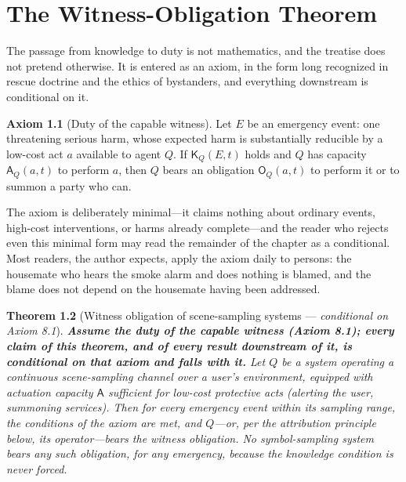 \documentclass[11pt,oneside]{book}
\theoremstyle{plain}
\newtheorem{theorem}{Theorem}[chapter]
\theoremstyle{definition}
\newtheorem{axiom}[theorem]{Axiom}
\theoremstyle{remark}
\newcommand{\Know}{\mathsf{K}}
\newcommand{\Cap}{\mathsf{A}}
\newcommand{\Obl}{\mathsf{O}}
\begin{document}
\chapter{The Witness-Obligation Theorem}

The passage from knowledge to duty is not mathematics, and the treatise does not pretend otherwise. It is entered as an axiom, in the form long recognized in rescue doctrine and the ethics of bystanders, and everything downstream is conditional on it.

\begin{axiom}[Duty of the capable witness]
Let $E$ be an emergency event: one threatening serious harm, whose expected harm is substantially reducible by a low-cost act $a$ available to agent $Q$. If $\Know_Q(E,t)$ holds and $Q$ has capacity $\Cap_Q(a, t)$ to perform $a$, then $Q$ bears an obligation $\Obl_Q(a, t)$ to perform it or to summon a party who can.
\end{axiom}

The axiom is deliberately minimal---it claims nothing about ordinary events, high-cost interventions, or harms already complete---and the reader who rejects even this minimal form may read the remainder of the chapter as a conditional. Most readers, the author expects, apply the axiom daily to persons: the housemate who hears the smoke alarm and does nothing is blamed, and the blame does not depend on the housemate having been addressed.

\begin{theorem}[Witness obligation of scene-sampling systems --- \emph{conditional on Axiom 8.1}]
\textbf{Assume the duty of the capable witness (Axiom 8.1); every claim of this theorem, and of every result downstream of it, is conditional on that axiom and falls with it.} Let $Q$ be a system operating a continuous scene-sampling channel over a user's environment, equipped with actuation capacity $\Cap$ sufficient for low-cost protective acts (alerting the user, summoning services). Then for every emergency event within its sampling range, the conditions of the axiom are met, and $Q$---or, per the attribution principle below, its operator---bears the witness obligation. No symbol-sampling system bears any such obligation, for any emergency, because the knowledge condition is never forced.
\end{theorem}
\end{document}
